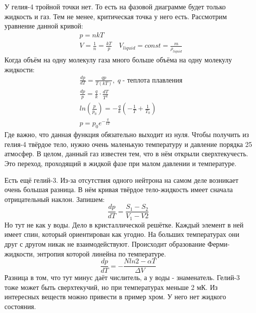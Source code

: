 \documentclass[a4paper, 12pt]{article}
\begin{document}
	У гелия-4 тройной точки нет. То есть на фазовой диаграмме будет только жидкость и газ. Тем не менее, критическая точка у него есть. Рассмотрим уравнение данной кривой:
	\begin{equation*}
		\begin{aligned}
			& p = nkT                                                                           \\
			& V = \frac{1}{n} = \frac{kT}{p} \quad V_{liquid} = const = \frac{m}{\rho_{liquid}} 
		\end{aligned}
	\end{equation*}
	Когда объём на одну молекулу газа много больше объёма на одну молекулу жидкости: 
	\begin{equation*}
		\begin{aligned}
			& \frac{dp}{dT} = \frac{qp}{T(kT)}, \; q  \; \text{- теплота плавления} \\
			& \frac{dp}{p} = \frac{q}{k} \cdot \frac{dT}{T^{2}}                                     \\
			& ln(\frac{p}{p_{0}}) = -\frac{q}{k}(-\frac{1}{T}+\frac{1}{T_0})                        \\
			& p = p_{0} e^{-\frac{q}{kT}}                                                           
		\end{aligned}
	\end{equation*}
	Где важно, что данная функция обязательно выходит из нуля. Чтобы получить из гелия-4 твёрдое тело, нужно очень маленькую температуру и давление порядка 25 атмосфер. В целом, данный газ известен тем, что в нём открыли сверхтекучесть. Это переход, проходящий в жидкой фазе при малом давлении и температуре. 
	
	Есть ещё гелий-3. Из-за отсутствия одного нейтрона на самом деле возникает очень большая разница. В нём кривая твёрдое тело-жидкость имеет сначала отрицательный наклон. Запишем: 
	\begin{equation*}
		\frac{dp}{dT} = \frac{S_{1}-S_{2}}{V_{1}-V{2}}
	\end{equation*}
	Но тут не как у воды. Дело в кристаллической решётке. Каждый элемент в ней имеет спин, который ориентирован как угодно. На больших температурах они друг с другом никак не взаимодействуют. Происходит образование Ферми-жидкости, энтропия которой линейна по температуре.
	\begin{equation*}
		\frac{dp}{dT} = -\frac{Nln2 - \alpha T}{\Delta V}
	\end{equation*}
	Разница в том, что тут минус даёт числитель, а у воды - знаменатель. Гелий-3 тоже может быть сверхтекучий, но при температурах меньше 2 мК. Из интересных веществ можно привести в пример хром. У него нет жидкого состояния.
\end{document}

